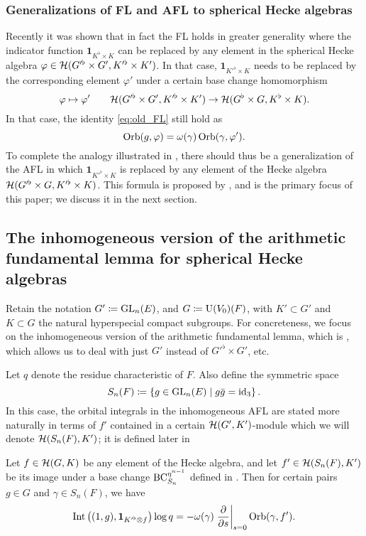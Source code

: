 \subsubsection{Generalizations of FL and AFL to spherical Hecke algebras}
Recently it was shown \cite{ref:leslie} that in fact
the FL holds in greater generality where the indicator function
$\mathbf{1}_{K^\flat \times K}$ can be replaced by any element
in the spherical Hecke algebra $\varphi \in \mathcal H(G'^\flat \times G', K'^\flat \times K')$.
In that case, $\mathbf{1}_{K'^\flat \times K}$ needs to be replaced
by the corresponding element $\varphi'$ under a certain base change homomorphism
\[ \varphi \mapsto \varphi' \qquad
  \mathcal H(G'^\flat \times G', K'^\flat \times K') \to \mathcal H(G^\flat \times G, K^\flat \times K). \]
In that case, the identity \eqref{eq:old_FL} still hold as
\begin{equation}
  \operatorname{Orb}(g, \varphi) = \omega(\gamma) \operatorname{Orb}(\gamma, \varphi').
  \label{eq:eq:leslie_FL}
\end{equation}
To complete the analogy illustrated in ,
there should thus be a generalization of the AFL in which
$\mathbf{1}_{K'^\flat \times K}$ is replaced by any element of the Hecke algebra
$\mathcal H(G'^\flat \times G, K'^\flat \times K)$.
This formula is proposed by \cite{ref:AFLspherical},
and is the primary focus of this paper; we discuss it in the next section.

\subsection{The inhomogeneous version of the arithmetic fundamental lemma for spherical Hecke algebras}
Retain the notation $G' \coloneqq \operatorname{GL}_n(E)$, and $G \coloneqq \operatorname{U}(V_0)(F)$,
with $K' \subset G'$ and $K \subset G$ the natural hyperspecial compact subgroups.
For concreteness, we focus on the inhomogeneous version
of the arithmetic fundamental lemma, which is \cite[Conjecture 6.2.1]{ref:AFLspherical},
which allows us to deal with just $G'$ instead of $G'^\flat \times G'$, etc.

Let $q$ denote the residue characteristic of $F$.
Also define the symmetric space
\[ S_n(F) \coloneqq \left\{ g \in \operatorname{GL}_n(E) \mid g \bar{g} = \operatorname{id}_3 \right\}. \]
In this case, the orbital integrals in the inhomogeneous AFL
are stated more naturally in terms of $f'$ contained in a certain
$\mathcal H(G',K')$-module which we will denote $\mathcal H(S_n(F), K')$;
it is defined later in

\begin{conjecture}
  \label{conj:inhomog}
  Let $f \in \mathcal H(G, K)$ be any element of the Hecke algebra,
  and let $f' \in \mathcal H(S_n(F), K')$ be its image
  under a base change $\operatorname{BC}_{S_n}^{\eta^{n-1}}$ defined in .
  Then for certain pairs $g \in G$
  and $\gamma \in S_n(F)$, we have
  \begin{equation}
    \operatorname{Int}\left( (1,g), \mathbf{1}_{K'^\flat \otimes f} \right) \log q
    = -\omega(\gamma) \left. \pdv{}{s} \right\rvert_{s=0} \operatorname{Orb}(\gamma, f').
    \label{eq:inhomog}
  \end{equation}
\end{conjecture}


